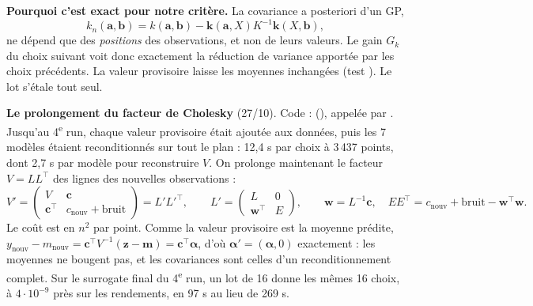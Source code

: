 \documentclass[10pt,a4paper]{article}
\begin{document}
\textbf{Pourquoi c'est exact pour notre critère.} La covariance a posteriori d'un GP,
\[
  k_n(\bm{a},\bm{b})=k(\bm{a},\bm{b})-\bm{k}(\bm{a},X)K^{-1}\bm{k}(X,\bm{b}),
\]
ne dépend que des \emph{positions} des observations, et non de leurs valeurs. Le gain $G_k$ du choix suivant voit donc exactement
la réduction de variance apportée par les choix précédents. La valeur provisoire laisse les moyennes
inchangées (test ). Le lot s'étale tout seul.

\textbf{Le prolongement du facteur de Cholesky} (27/10). Code : 
(), appelée par . Jusqu'au 4\textsuperscript{e} run, chaque
valeur provisoire était ajoutée aux
données, puis les 7 modèles étaient reconditionnés sur tout le plan : 12,4 s par choix à 3\,437 points, dont
2,7 s par modèle pour reconstruire $V$. On prolonge maintenant le facteur $V=LL^\top$ des lignes des
nouvelles observations :
\[
  V'=\begin{pmatrix}V & \bm c\\ \bm c^\top & c_{\text{nouv}}+\text{bruit}\end{pmatrix}=L'L'^\top,\qquad
  L'=\begin{pmatrix}L&0\\ \bm w^\top & E\end{pmatrix},\qquad
  \bm w=L^{-1}\bm c,\quad EE^\top=c_{\text{nouv}}+\text{bruit}-\bm w^\top\bm w .
\]
Le coût est en $n^2$ par point. Comme la valeur provisoire est la moyenne prédite,
$y_{\text{nouv}}-m_{\text{nouv}}=\bm c^\top V^{-1}(\bm z-\bm m)=\bm c^\top\bm\alpha$, d'où $\bm\alpha'=(\bm\alpha,0)$
exactement : les moyennes ne bougent pas, et les covariances sont celles d'un reconditionnement complet. Sur le
surrogate final du 4\textsuperscript{e} run, un lot de 16 donne les mêmes 16 choix, à $4\cdot10^{-9}$ près sur
les rendements, en 97 s au lieu de 269 s.
\end{document}
